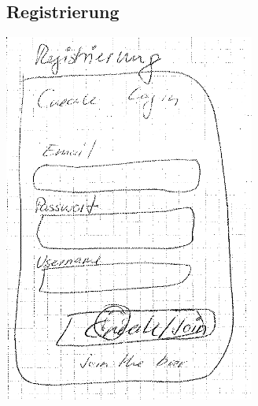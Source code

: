 \documentclass[10pt,a4paper]{scrartcl}
\begin{document}
\subsection{Registrierung}
\includegraphics[scale=.5]{registrierung-skizze.png}
\end{document}
